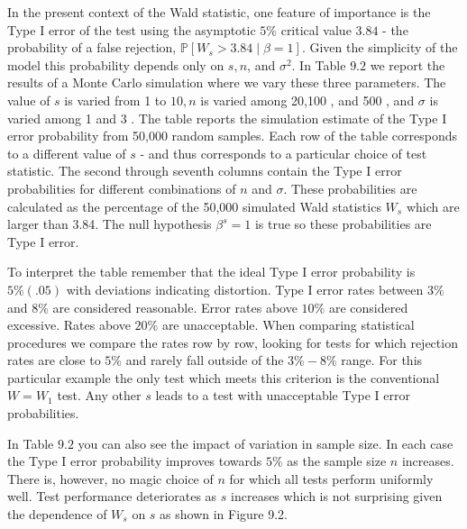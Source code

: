 \documentclass[10pt]{article}
\begin{document}
In the present context of the Wald statistic, one feature of importance is the Type I error of the test using the asymptotic $5 \%$ critical value $3.84$ - the probability of a false rejection, $\mathbb{P}\left[W_{s}>3.84 \mid \beta=1\right]$. Given the simplicity of the model this probability depends only on $s, n$, and $\sigma^{2}$. In Table $9.2$ we report the results of a Monte Carlo simulation where we vary these three parameters. The value of $s$ is varied from 1 to $10, n$ is varied among 20,100 , and 500 , and $\sigma$ is varied among 1 and 3 . The table reports the simulation estimate of the Type I error probability from 50,000 random samples. Each row of the table corresponds to a different value of $s$ - and thus corresponds to a particular choice of test statistic. The second through seventh columns contain the Type I error probabilities for different combinations of $n$ and $\sigma$. These probabilities are calculated as the percentage of the 50,000 simulated Wald statistics $W_{s}$ which are larger than 3.84. The null hypothesis $\beta^{s}=1$ is true so these probabilities are Type I error.

To interpret the table remember that the ideal Type I error probability is $5 \%(.05)$ with deviations indicating distortion. Type I error rates between $3 \%$ and $8 \%$ are considered reasonable. Error rates above $10 \%$ are considered excessive. Rates above $20 \%$ are unacceptable. When comparing statistical procedures we compare the rates row by row, looking for tests for which rejection rates are close to $5 \%$ and rarely fall outside of the $3 \%-8 \%$ range. For this particular example the only test which meets this criterion is the conventional $W=W_{1}$ test. Any other $s$ leads to a test with unacceptable Type I error probabilities.

In Table $9.2$ you can also see the impact of variation in sample size. In each case the Type I error probability improves towards $5 \%$ as the sample size $n$ increases. There is, however, no magic choice of $n$ for which all tests perform uniformly well. Test performance deteriorates as $s$ increases which is not surprising given the dependence of $W_{s}$ on $s$ as shown in Figure 9.2.
\end{document}
